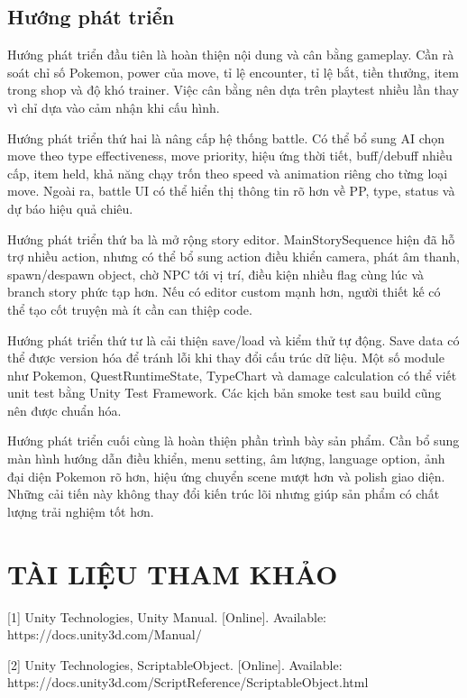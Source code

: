 \section{Hướng phát triển}

Hướng phát triển đầu tiên là hoàn thiện nội dung và cân bằng gameplay. Cần rà soát chỉ số Pokemon, power của move, tỉ lệ encounter, tỉ lệ bắt, tiền thưởng, item trong shop và độ khó trainer. Việc cân bằng nên dựa trên playtest nhiều lần thay vì chỉ dựa vào cảm nhận khi cấu hình.

Hướng phát triển thứ hai là nâng cấp hệ thống battle. Có thể bổ sung AI chọn move theo type effectiveness, move priority, hiệu ứng thời tiết, buff/debuff nhiều cấp, item held, khả năng chạy trốn theo speed và animation riêng cho từng loại move. Ngoài ra, battle UI có thể hiển thị thông tin rõ hơn về PP, type, status và dự báo hiệu quả chiêu.

Hướng phát triển thứ ba là mở rộng story editor. MainStorySequence hiện đã hỗ trợ nhiều action, nhưng có thể bổ sung action điều khiển camera, phát âm thanh, spawn/despawn object, chờ NPC tới vị trí, điều kiện nhiều flag cùng lúc và branch story phức tạp hơn. Nếu có editor custom mạnh hơn, người thiết kế có thể tạo cốt truyện mà ít cần can thiệp code.

Hướng phát triển thứ tư là cải thiện save/load và kiểm thử tự động. Save data có thể được version hóa để tránh lỗi khi thay đổi cấu trúc dữ liệu. Một số module như Pokemon, QuestRuntimeState, TypeChart và damage calculation có thể viết unit test bằng Unity Test Framework. Các kịch bản smoke test sau build cũng nên được chuẩn hóa.

Hướng phát triển cuối cùng là hoàn thiện phần trình bày sản phẩm. Cần bổ sung màn hình hướng dẫn điều khiển, menu setting, âm lượng, language option, ảnh đại diện Pokemon rõ hơn, hiệu ứng chuyển scene mượt hơn và polish giao diện. Những cải tiến này không thay đổi kiến trúc lõi nhưng giúp sản phẩm có chất lượng trải nghiệm tốt hơn.

\chapter*{TÀI LIỆU THAM KHẢO}

[1] Unity Technologies, Unity Manual. [Online]. Available: https://docs.unity3d.com/Manual/

[2] Unity Technologies, ScriptableObject. [Online]. Available: https://docs.unity3d.com/ScriptReference/ScriptableObject.html

